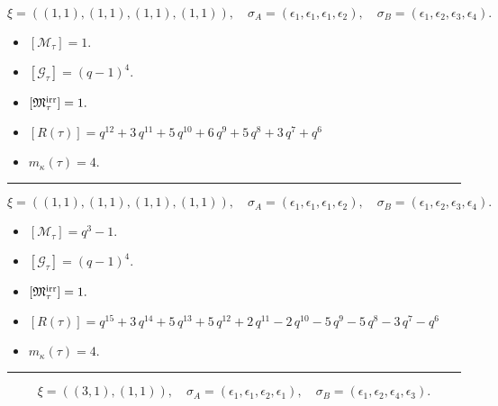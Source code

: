 \documentclass[10pt,a4paper]{amsart}
\begin{document}
$$\xi = ({(1, 1), (1, 1), (1, 1), (1, 1)}),\quad \sigma_A = ({{\epsilon_1}, {\epsilon_1}, {\epsilon_1}, {\epsilon_2}}),\quad \sigma_B = ({{\epsilon_1}, {\epsilon_2}, {\epsilon_3}, {\epsilon_4}}).$$

\begin{itemize}
 \item $[\mathcal{M}_{\tau}] = 1 .$

 \item $[\mathcal{G}_{\tau}] = {\left(q - 1\right)}^{4} .$

 \item $[{\frak M}_{\tau}^{\textrm{irr}}] = 1 .$

 \item $[R(\tau)] = q^{12} + 3 \, q^{11} + 5 \, q^{10} + 6 \, q^{9} + 5 \, q^{8} + 3 \, q^{7} + q^{6} $

 \item $m_{\kappa}(\tau) = 4 .$

 \end{itemize}
\noindent\rule{8cm}{0.4pt}

$$\xi = ({(1, 1), (1, 1), (1, 1)}, {(1, 1)}),\quad \sigma_A = ({{\epsilon_1}, {\epsilon_1}, {\epsilon_1}}, {{\epsilon_2}}),\quad \sigma_B = ({{\epsilon_1}, {\epsilon_2}, {\epsilon_3}}, {{\epsilon_4}}).$$

\begin{itemize}
 \item $[\mathcal{M}_{\tau}] = q^{3} - 1 .$

 \item $[\mathcal{G}_{\tau}] = {\left(q - 1\right)}^{4} .$

 \item $[{\frak M}_{\tau}^{\textrm{irr}}] = 1 .$

 \item $[R(\tau)] = q^{15} + 3 \, q^{14} + 5 \, q^{13} + 5 \, q^{12} + 2 \, q^{11} - 2 \, q^{10} - 5 \, q^{9} - 5 \, q^{8} - 3 \, q^{7} - q^{6} $

 \item $m_{\kappa}(\tau) = 4 .$

 \end{itemize}
\noindent\rule{8cm}{0.4pt}

$$\xi = ({(3, 1)}, {(1, 1)}),\quad \sigma_A = ({{\epsilon_1, \epsilon_1, \epsilon_2}}, {{\epsilon_1}}),\quad \sigma_B = ({{\epsilon_1, \epsilon_2, \epsilon_4}}, {{\epsilon_3}}).$$
\end{document}
